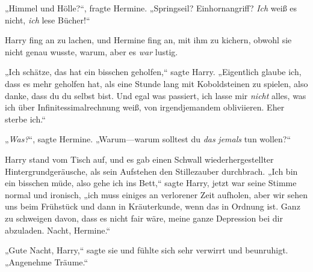 „Himmel und Hölle?“, fragte Hermine. „Springseil? Einhornangriff? \emph{Ich} weiß es nicht, \emph{ich} lese Bücher!“

Harry fing an zu lachen, und Hermine fing an, mit ihm zu kichern, obwohl sie nicht genau wusste, warum, aber es \emph{war} lustig.

„Ich schätze, das hat ein bisschen geholfen,“ sagte Harry. „Eigentlich glaube ich, dass es mehr geholfen hat, als eine Stunde lang mit Koboldsteinen zu spielen, also danke, dass du du selbst bist. Und egal was passiert, ich lasse mir \emph{nicht} alles, was ich über Infinitessimalrechnung weiß, von irgendjemandem obliviieren. Eher sterbe ich.“

„\emph{Was?}“, sagte Hermine. „Warum—warum solltest du \emph{das} \emph{jemals} tun wollen?“

Harry stand vom Tisch auf, und es gab einen Schwall wiederhergestellter Hintergrundgeräusche, als sein Aufstehen den Stillezauber durchbrach. „Ich bin ein bisschen müde, also gehe ich ins Bett,“ sagte Harry, jetzt war seine Stimme normal und ironisch, „ich muss einiges an verlorener Zeit aufholen, aber wir sehen uns beim Frühstück und dann in Kräuterkunde, wenn das in Ordnung ist. Ganz zu schweigen davon, dass es nicht fair wäre, meine ganze Depression bei dir abzuladen. Nacht, Hermine.“

„Gute Nacht, Harry,“ sagte sie und fühlte sich sehr verwirrt und beunruhigt. „Angenehme Träume.“

